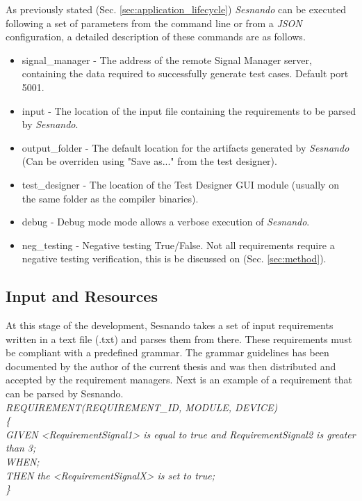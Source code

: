 As previously stated (Sec. \ref{sec:application_lifecycle}) \textit{Sesnando} can be executed following a set of parameters from the command line or from a \textit{JSON} configuration, a detailed description of these commands are as follows.

\begin{itemize}
    \item signal\_manager - The address of the remote Signal Manager server, containing the data required to successfully generate test cases. Default port 5001.
    \item input - The location of the input file containing the requirements to be parsed by \textit{Sesnando}.
    \item output\_folder - The default location for the artifacts generated by \textit{Sesnando} (Can be overriden using "Save as..." from the test designer).
    \item test\_designer - The location of the Test Designer GUI module (usually on the same folder as the compiler binaries).
    \item debug - Debug mode mode allows a verbose execution of \textit{Sesnando}.
    \item neg\_testing - Negative testing True/False. Not all requirements require a negative testing verification, this is be discussed on (Sec. \ref{sec:method}).
\end{itemize}


\subsection{Input and Resources}
\label{subsec:sesnando_input}

At this stage of the development, Sesnando takes a set of input requirements written in a text file (.txt) and parses them from there. These requirements must be compliant with a predefined grammar. The grammar guidelines has been documented by the author of the current thesis and was then distributed and accepted by the requirement managers. Next is an example of a requirement that can be parsed by Sesnando.\\


\textit{
REQUIREMENT(REQUIREMENT\_ID, MODULE, DEVICE)\\
\{\\
	GIVEN <RequirementSignal1> is equal to true and RequirementSignal2 is greater than 3;\\
	WHEN;\\
	THEN the <RequirementSignalX> is set to true;\\
\}
}\\
\label{eq:requirement_example}


